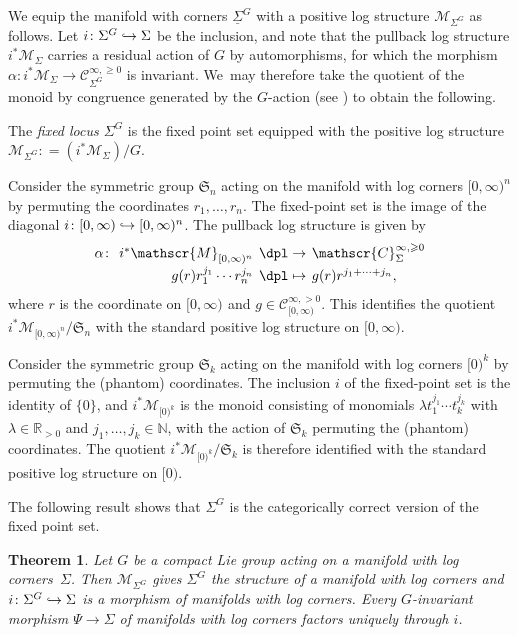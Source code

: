 \documentclass[JEP,XML,SOM,Unicode,NoFloatCountersInSection,published]{cedram}
\newcommand\mto{\mathchoice{\longmapsto}{\mapsto}{\mapsto}{\mapsto}}
\newcommand\hto{\mathrel{\lhook\joinrel\to}}
\newcommand{\mapdef}[5]{\arraycolsep2pt
\begin{array}{crcl}
#1 \colon & #2 &\dpl\to & #3 \\[3pt]
& #4 &\dpl\mto& #5
\end{array}
}
\newtheorem{theorem}{Theorem}[section]
\theoremstyle{definition}
\theoremstyle{remark}
\newenvironment{example}
  {\pushQED{\qed}\renewcommand{\qedsymbol}{$\lozenge$}\examplex}
  {\popQED\endexamplex}
\let\defn\emph
\newcommand{\RR}{\mathbb{R}}
\newcommand{\NN}{\mathbb{N}}
\newcommand{\halfspc}[1]{[0,\infty)^{#1}}
\renewcommand{\ge}{\geqslant}
\newcommand{\defas}{\mathrel{\mathop:}=}
\newcommand{\cM}{\mathscr{M}}
\newcommand{\Cinfpos}[1]{\mathscr{C}^{\infty, > 0}_{#1}}
\newcommand{\Cinfge}[1]{\mathscr{C}^{\infty, \ge 0}_{#1}}
\newcommand{\Sig}{\Sigma}
\newcommand{\uSig}{\underline{\Sigma}}
\newcommand{\symgp}[1]{\mathfrak{S}_{#1}}
\begin{document}
We equip the manifold with corners $\uSig^G$ with a positive log structure $\cM_{\Sig^G}$ as follows. Let $i\colon \Sig^G \hto\Sig$ be the inclusion, and note that the pullback log structure $i^*\cM_{\Sig}$ carries a residual action of $G$ by automorphisms, for which the morphism $\alpha\colon i^*\cM_{\Sig} \to \Cinfge{\Sig^G}$ is invariant. We~may therefore take the quotient of the monoid by congruence generated by the $G$\nobreakdash-action (see \cite[\S{}I.1.1]{Ogus}) to obtain the following.
\begin{definition}
The \defn{fixed locus $\Sig^G$} is the fixed point set equipped with the positive log structure $\cM_{\Sig^G}\defas (i^*\cM_{\Sig})/G$.
\end{definition}

\begin{example}\label{ex:quotient-basic}
Consider the symmetric group $\symgp{n}$ acting on the manifold with log corners $\halfspc{n}$ by permuting the coordinates $r_1,\ldots,r_n$. The fixed-point set is the image of the diagonal $i\colon[0,\infty)\hto\halfspc{n}$. The pullback log structure is given by
\[
\mapdef{\alpha}{i^*\cM_{\halfspc{n}}}{\Cinfge{\Sig}}
{g(r)r_1^{j_1}\cdots r_n^{j_n}}{g(r)r^{j_1+\cdots+j_n},}
\]
where $r$ is the coordinate on $\halfspc{}$ and $g \in \Cinfpos{\halfspc{}}$. This identifies the quotient $i^*\cM_{\halfspc{n}}/\symgp{n}$ with the standard positive log structure on $[0,\infty)$.
\end{example}

\begin{example}\label{ex:quotient-phantom}
Consider the symmetric group $\symgp{k}$ acting on the manifold with log corners $[0)^k$ by permuting the (phantom) coordinates. The inclusion $i$ of the fixed-point set is the identity of $\{0\}$, and $i^*\cM_{[0)^k}$ is the monoid consisting of monomials $\lambda t_1^{j_1}\cdots t_k^{j_k}$ with $\lambda\in\RR_{>0}$ and $j_1,\ldots,j_k\in\NN$, with the action of $\symgp{k}$ permuting the (phantom) coordinates. The quotient $i^*\cM_{[0)^k}/\symgp{k}$ is therefore identified with the standard positive log structure on $[0)$.
\end{example}

The following result shows that $\Sig^G$ is the categorically correct version of the fixed point set.

\begin{theorem}\label{thm:fixed-locus}
Let $G$ be a compact Lie group acting on a manifold with log corners~$\Sig$. Then $\cM_{\Sig^G}$ gives $\Sig^G$ the structure of a manifold with log corners and $i\colon \Sig^G\hto \Sig$ is a morphism of manifolds with log corners. Every $G$\nobreakdash-invariant morphism $\Psi \to \Sig$ of manifolds with log corners factors uniquely through $i$.
\end{theorem}
\end{document}
